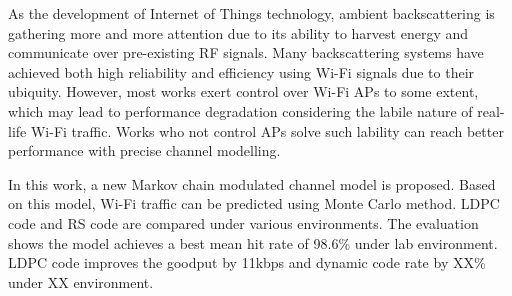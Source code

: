 \begin{enabstract}
%
As the development of Internet of Things technology, ambient backscattering is gathering more and
more attention due to its ability to harvest energy and communicate over pre-existing RF signals.
Many backscattering systems have achieved both high reliability and efficiency using Wi-Fi signals due to 
their ubiquity. However, most works exert control over Wi-Fi APs to some extent, which may lead to performance 
degradation considering the labile nature of real-life Wi-Fi traffic. Works who not control APs solve such lability can 
reach better performance with precise channel modelling.

In this work, a new Markov chain modulated channel model is proposed. Based on this model, Wi-Fi traffic can be predicted using Monte Carlo method. LDPC code and RS code are compared under various environments. The evaluation shows the model achieves a best mean hit rate of 98.6\% under lab environment. LDPC code improves the goodput by 11kbps and dynamic code rate by XX\% under XX environment.
\end{enabstract}
